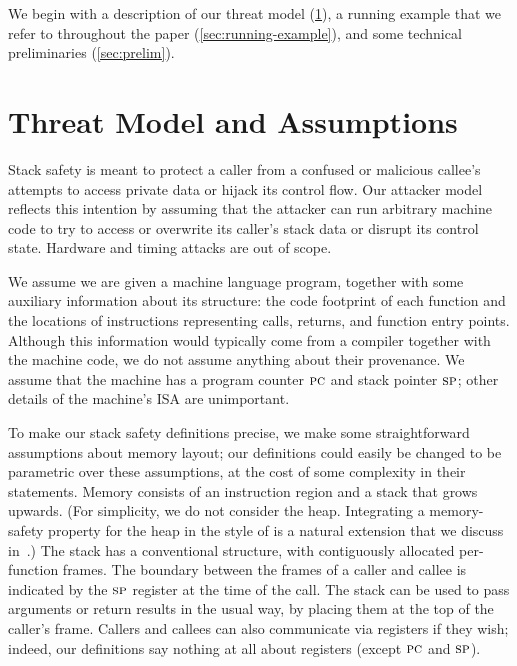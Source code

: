 \documentclass[acmsmall,review,anonymous]{acmart}\settopmatter{printfolios=true,printccs=false,printacmref=false}
\begin{document}
We begin with a description of our threat model
(\cref{sec:threat}), a running example that we refer to throughout the paper
(\cref{sec:running-example}),  and some technical preliminaries
(\cref{sec:prelim}).

\section{Threat Model and Assumptions}
\label{sec:threat}

Stack safety is meant to protect a caller from a confused or malicious callee's
attempts to access private data or hijack its control flow. Our
attacker model reflects this intention by assuming that the attacker
can run arbitrary machine code to try to access or overwrite its caller's stack data
or disrupt its control state.  Hardware and timing attacks are out of
scope.

\newcommand*{\rsp}{\textsc{sp}}

We assume we are given a machine language program, together with some auxiliary information
about its structure: the code footprint of each function and the locations of instructions
representing calls, returns, and function entry points.
Although this information would typically come from a compiler together with
the machine code, we do not
assume anything about their provenance.  We assume that the machine has a
program counter $\textsc{pc}$
and stack pointer $\rsp$; other details of the machine's ISA are unimportant.

To make our stack safety definitions precise, we make some straightforward
assumptions about
memory layout; our definitions could easily be changed to be parametric over
these assumptions, at the cost of some complexity in their statements.  Memory
consists of an instruction region and a stack that grows upwards. (For simplicity,
we do not consider the heap. Integrating a memory-safety property for the
heap in the style of
\citet{DBLP:conf/post/AmorimHP18} is a natural extension that we discuss
in~.)  The stack has a conventional structure, with
contiguously allocated per-function frames.
The boundary between the frames of a caller and callee is indicated by the $\rsp$ register
at the time of the call.  The stack can be used to
pass arguments or return results in the usual way, by placing them
at the top of the caller's frame. Callers and callees can also communicate
via registers if they wish; indeed, our 
definitions say nothing at all about registers (except $\textsc{pc}$ and
$\rsp$). 
\end{document}
